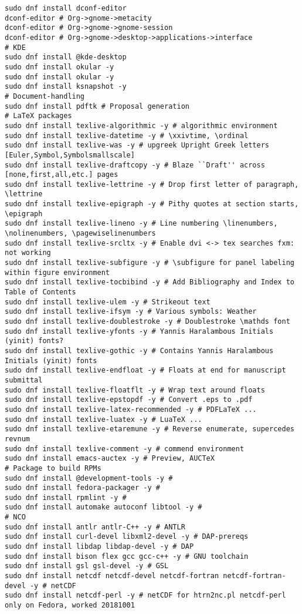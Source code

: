 \documentclass[12pt,twoside]{article}
\begin{document}
\begin{verbatim}
sudo dnf install dconf-editor
dconf-editor # Org->gnome->metacity
dconf-editor # Org->gnome->gnome-session
dconf-editor # Org->gnome->desktop->applications->interface
# KDE
sudo dnf install @kde-desktop
sudo dnf install okular -y 
sudo dnf install okular -y
sudo dnf install ksnapshot -y
# Document-handling
sudo dnf install pdftk # Proposal generation
# LaTeX packages
sudo dnf install texlive-algorithmic -y # algorithmic environment
sudo dnf install texlive-datetime -y # \xxivtime, \ordinal
sudo dnf install texlive-was -y # upgreek Upright Greek letters [Euler,Symbol,Symbolsmallscale]
sudo dnf install texlive-draftcopy -y # Blaze ``Draft'' across [none,first,all,etc.] pages
sudo dnf install texlive-lettrine -y # Drop first letter of paragraph, \lettrine
sudo dnf install texlive-epigraph -y # Pithy quotes at section starts, \epigraph
sudo dnf install texlive-lineno -y # Line numbering \linenumbers, \nolinenumbers, \pagewiselinenumbers
sudo dnf install texlive-srcltx -y # Enable dvi <-> tex searches fxm: not working
sudo dnf install texlive-subfigure -y # \subfigure for panel labeling within figure environment
sudo dnf install texlive-tocbibind -y # Add Bibliography and Index to Table of Contents
sudo dnf install texlive-ulem -y # Strikeout text
sudo dnf install texlive-ifsym -y # Various symbols: Weather
sudo dnf install texlive-doublestroke -y # Doublestroke \mathds font
sudo dnf install texlive-yfonts -y # Yannis Haralambous Initials (yinit) fonts?
sudo dnf install texlive-gothic -y # Contains Yannis Haralambous Initials (yinit) fonts
sudo dnf install texlive-endfloat -y # Floats at end for manuscript submittal
sudo dnf install texlive-floatflt -y # Wrap text around floats
sudo dnf install texlive-epstopdf -y # Convert .eps to .pdf
sudo dnf install texlive-latex-recommended -y # PDFLaTeX ...
sudo dnf install texlive-luatex -y # LuaTeX ...
sudo dnf install texlive-etaremune -y # Reverse enumerate, supercedes revnum
sudo dnf install texlive-comment -y # commend environment
sudo dnf install emacs-auctex -y # Preview, AUCTeX
# Package to build RPMs
sudo dnf install @development-tools -y #
sudo dnf install fedora-packager -y #
sudo dnf install rpmlint -y # 
sudo dnf install automake autoconf libtool -y #
# NCO
sudo dnf install antlr antlr-C++ -y # ANTLR
sudo dnf install curl-devel libxml2-devel -y # DAP-prereqs
sudo dnf install libdap libdap-devel -y # DAP
sudo dnf install bison flex gcc gcc-c++ -y # GNU toolchain
sudo dnf install gsl gsl-devel -y # GSL
sudo dnf install netcdf netcdf-devel netcdf-fortran netcdf-fortran-devel -y # netCDF
sudo dnf install netcdf-perl -y # netCDF for htrn2nc.pl netcdf-perl only on Fedora, worked 20181001

\end{verbatim}
\end{document}
